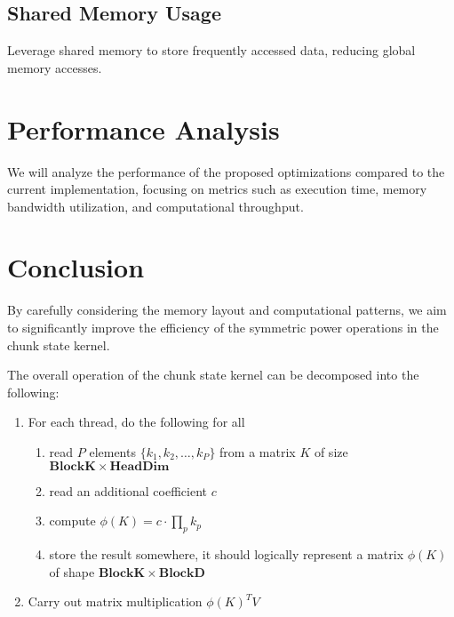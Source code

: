 \documentclass{article}
\begin{document}
\subsection{Shared Memory Usage}
Leverage shared memory to store frequently accessed data, reducing global memory accesses.

\section{Performance Analysis}
We will analyze the performance of the proposed optimizations compared to the current implementation, focusing on metrics such as execution time, memory bandwidth utilization, and computational throughput.

\section{Conclusion}
By carefully considering the memory layout and computational patterns, we aim to significantly improve the efficiency of the symmetric power operations in the chunk state kernel.

The overall operation of the chunk state kernel can be decomposed into the following:

\begin{enumerate}
    \item For each thread, do the following for all
    \begin{enumerate}
        \item read \( P \) elements \( \{ k_1, k_2, \ldots, k_P \} \) from a matrix \( K \) of size \( \mathbf{BlockK} \times \mathbf{HeadDim} \)
        \item read an additional coefficient \( c \)
        \item compute \(\phi(K) = c \cdot \prod_{p} k_p\)
        \item store the result somewhere, it should logically represent a matrix \( \phi(K) \) of shape \( \mathbf{BlockK} \times \mathbf{BlockD} \)
    \end{enumerate}
    \item Carry out matrix multiplication \(\phi(K)^T V\)
\end{enumerate}
\end{document}
